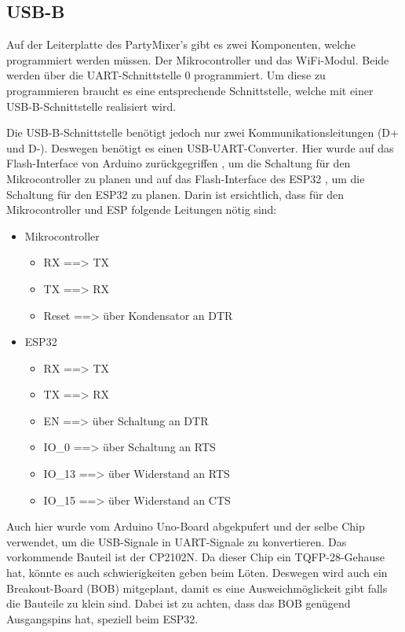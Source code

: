 \subsection{USB-B}
\label{subsec:USB-B}

Auf der Leiterplatte des PartyMixer's gibt es zwei Komponenten, welche programmiert werden müssen. Der Mikrocontroller und das WiFi-Modul. Beide werden über die UART-Schnittstelle 0 programmiert. Um diese zu programmieren braucht es eine entsprechende Schnittstelle, welche mit einer USB-B-Schnittstelle realisiert wird.

Die USB-B-Schnittstelle benötigt jedoch nur zwei Kommunikationsleitungen (D+ und D-). Deswegen benötigt es einen USB-UART-Converter. Hier wurde auf das Flash-Interface von Arduino zurückgegriffen \cite{arduino_cc_arduino_2017}, um die Schaltung für den Mikrocontroller zu planen und auf das Flash-Interface des ESP32 \cite{espressif_systems_esp32_2016}, um die Schaltung für den ESP32 zu planen. Darin ist ersichtlich, dass für den Mikrocontroller und ESP folgende Leitungen nötig sind:

\begin{itemize}
\item Mikrocontroller
\begin{itemize}
\item RX ==> TX
\item TX ==> RX
\item Reset ==> über Kondensator an DTR
\end{itemize}
\item ESP32
\begin{itemize}
\item RX ==> TX
\item TX ==> RX
\item EN ==> über Schaltung an DTR
\item IO\_0 ==> über Schaltung an RTS
\item IO\_13 ==> über Widerstand an RTS
\item IO\_15 ==> über Widerstand an CTS
\end{itemize}
\end{itemize}

Auch hier wurde vom Arduino Uno-Board abgekpufert und der selbe Chip verwendet, um die USB-Signale in UART-Signale zu konvertieren. Das vorkommende Bauteil ist der CP2102N. Da dieser Chip ein TQFP-28-Gehause hat, könnte es auch schwierigkeiten geben beim Löten. Deswegen wird auch ein Breakout-Board (BOB) mitgeplant, damit es eine Ausweichmöglickeit gibt falls die Bauteile zu klein sind. Dabei ist zu achten, dass das BOB genügend Ausgangspins hat, speziell beim ESP32.


